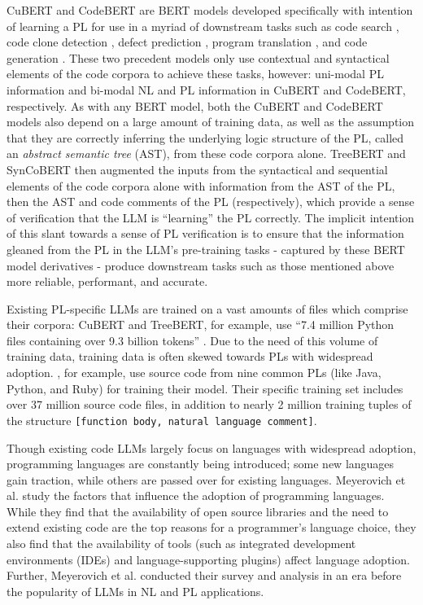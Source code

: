 \documentclass[acmlarge]{acmart}
\begin{document}
CuBERT \cite{CuBERT} and CodeBERT \cite{CodeBERT} are BERT models developed specifically with intention of learning a PL for use in a myriad of downstream tasks such as code search \cite{code-search}, code clone detection \cite{clone-detection}, defect prediction \cite{defect-prediction}, program translation \cite{program-translation}, and code generation \cite{svyatkovskiy-generation}. These two precedent models only use contextual and syntactical elements of the code corpora to achieve these tasks, however: uni-modal PL information and bi-modal NL and PL information in CuBERT and CodeBERT, respectively. As with any BERT model, both the CuBERT and CodeBERT models also depend on a large amount of training data, as well as the assumption that they are correctly inferring the underlying logic structure of the PL, called an \textit{abstract semantic tree} (AST), from these code corpora alone. TreeBERT \cite{TreeBERT} and SynCoBERT \cite{SynCoBERT} then augmented the inputs from the syntactical and sequential elements of the code corpora alone with information from the AST of the PL, then the AST and code comments of the PL (respectively), which provide a sense of verification that the LLM is ``learning'' the PL correctly. The implicit intention of this slant towards a sense of PL verification is to ensure that the information gleaned from the PL in the LLM's pre-training tasks - captured by these BERT model derivatives - produce downstream tasks such as those mentioned above more reliable, performant, and accurate.

Existing PL-specific LLMs are trained on a vast amounts of files which comprise their corpora: CuBERT and TreeBERT, for example, use ``7.4 million Python files containing over 9.3 billion tokens'' \cite[p. 3]{CuBERT}. Due to the need of this volume of training data, training data is often skewed towards PLs with widespread adoption. \cite{wang-contrastive-learning}, for example, use source code from nine common PLs (like Java, Python, and Ruby) for training their model. Their specific training set includes over 37 million source code files, in addition to nearly 2 million training tuples of the structure \texttt{[function body, natural language comment]}.

Though existing code LLMs largely focus on languages with widespread adoption, programming languages are constantly being introduced; some new languages gain traction, while others are passed over for existing languages. Meyerovich et al. \cite{code-adoption} study the factors that influence the adoption of programming languages. While they find that the availability of open source libraries and the need to extend existing code are the top reasons for a programmer's language choice, they also find that the availability of tools (such as integrated development environments (IDEs) and language-supporting plugins) affect language adoption. Further, Meyerovich et al.  conducted their survey and analysis in an era before the popularity of LLMs in NL and PL applications. 
\end{document}
